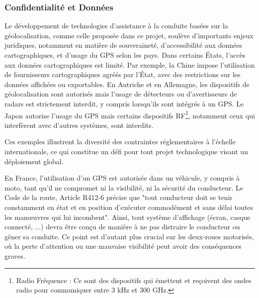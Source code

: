 \subsubsection{Confidentialité et Données}
Le développement de technologies d’assistance à la conduite basées sur la géolocalisation, comme celle proposée dans ce projet, soulève d’importants enjeux juridiques, notamment en matière de souveraineté, d’accessibilité aux données cartographiques, et d’usage du GPS selon les pays.
Dans certains États, l’accès aux données cartographiques est limité. Par exemple, la Chine impose l’utilisation de fournisseurs cartographiques agréés par l’État, avec des restrictions sur les données affichées ou exportables. En Autriche et en Allemagne, les dispositifs de géolocalisation sont autorisés mais l’usage de détecteurs ou d'avertisseurs de radars est strictement interdit, y compris lorsqu'ils sont intégrés à un GPS. Le Japon autorise l’usage du GPS mais certains dispositifs RF\footnote{Radio Fréquence : Ce sont des dispositifs qui émettent et reçoivent des ondes radio pour communiquer entre 3 kHz et 300 GHz.}, notamment ceux qui interfèrent avec d'autres systèmes, sont interdits.

Ces exemples illustrent la diversité des contraintes réglementaires à l’échelle internationale, ce qui constitue un défi pour tout projet technologique visant un déploiement global.
\vspace{0.5cm}

En France, l'utilisation d’un GPS est autorisée dans un véhicule, y compris à moto, tant qu’il ne compromet ni la visibilité, ni la sécurité du conducteur. Le Code de la route, Article R412-6\cite{loi_code_de_la_route} précise que "tout conducteur doit se tenir constamment en état et en position d'exécuter commodément et sans délai toutes les manœuvres qui lui incombent".
Ainsi, tout système d’affichage (écran, casque connecté, ...) devra être conçu de manière à ne pas distraire le conducteur ou gêner sa conduite. Ce point est d’autant plus crucial sur les deux-roues motorisés, où la perte d’attention ou une mauvaise visibilité peut avoir des conséquences graves.
\vspace{0.5cm}

